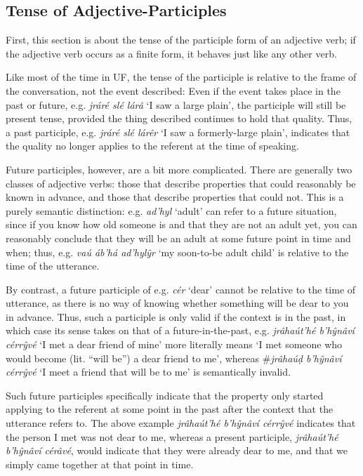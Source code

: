 \documentclass[a4paper, 12pt, twoside, openright, final]{book}
\let \w \textit
\begin{document}
\subsection{Tense of Adjective-Participles}
First, this section is about the tense of the participle form of an adjective verb; if the adjective verb occurs as a
finite form, it behaves just like any other verb.

Like most of the time in UF, the tense of the participle is relative to the frame of the conversation, not
the event described: Even if the event takes place in the past or future, e.g. \w{jráré slé lárâ} ‘I saw a large plain’,
the participle will still be present tense, provided the thing described continues to hold that quality. Thus, a past
participle, e.g. \w{jráré slé lárêr} ‘I saw a formerly-large plain’, indicates that the quality no longer applies to
the referent at the time of speaking.

Future participles, however, are a bit more complicated. There are generally two classes of adjective verbs: those that
describe properties that
could reasonably be known in advance, and those that describe properties that could not. This is a purely semantic distinction: e.g. \w{ad’hyl}
‘adult’ can refer to a future situation, since if you know how old someone is and that they are not an adult yet, you
can reasonably conclude that they will be an adult at some future point in time and when; thus, e.g. \w{vaú áb’há ad’hylŷr}
‘my soon-to-be adult child’ is relative to the time of the utterance.

By contrast, a future participle of e.g. \w{cér} ‘dear’ cannot be relative to the time of utterance, as there is no way of
knowing whether something will be dear to you in advance. Thus, such a participle is only valid if the context is in
the past, in which case its sense takes on that of a future-in-the-past, e.g. \w{jrâhaút’hé b’hŷnâví cérrŷvé} ‘I met a dear
friend of mine’ more literally means ‘I met someone who would become (lit. “will be”) a dear friend to me’, whereas
\#\w{jrâhaúḍ b’hŷnâví cérrŷvé} ‘I meet a friend that will be to me’ is semantically invalid.

Such future participles specifically indicate that the property only started applying to the referent at some point in the
past after the context that the utterance refers to. The above example \w{jrâhaút’hé b’hŷnâví cérrŷvé} indicates that the
person I met was not dear to me, whereas a present participle, \w{jrâhaút’hé b’hŷnâví cérâvé}, would indicate that
they were already dear to me, and that we simply came together at that point in time.
\end{document}
